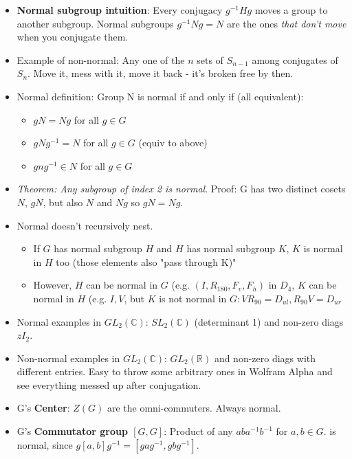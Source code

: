 \documentclass[11pt, oneside]{article}   	%
\begin{document}
\begin{itemize}
\item \textbf{Normal subgroup intuition}: Every conjugacy $g^{-1}Hg$ moves a group to another subgroup.  Normal subgroups  $g^{-1}Ng = N$ are the ones \emph{that don't move} when you conjugate them.
\item Example of non-normal: Any one of the $n$ sets of $S_{n-1}$ among conjugates of $S_n$.     Move it, mess with it, move it back - it's broken free by then.
\item Normal definition: Group N is normal if and only if (all equivalent):
	\begin{itemize}
	\item $gN = Ng$ for all $g \in G$
	\item $gNg^{-1} = N$ for all $g \in G$ (equiv to above)
	\item $gng^{-1} \in N$ for all $g \in G$
	\end{itemize}
\item \emph{Theorem: Any subgroup of index 2 is normal}.  Proof: G has two distinct cosets $N$, $gN$, but also $N$ and $Ng$ so $gN = Ng$.
\item Normal doesn't recursively nest.  
	\begin{itemize}
	\item If $G$ has normal subgroup $H$ and $H$ has normal subgroup $K$, $K$ is normal in $H$ too (those elements also "pass through K)"
	\item However, $H$ can be normal in $G$ (e.g. $(I, R_{180}, F_v, F_h)$ in $D_4$,  $K$ can be normal in $H$ (e.g. ${I, V}$, but $K$ is not normal in $G: VR_{90} = D_{ul}, R_{90}V = D_{ur}$
	\end{itemize}
\item Normal examples in $GL_2(\mathbb{C})$: $SL_2(\mathbb{C})$ (determinant 1) and non-zero diags $zI_2$.  
\item Non-normal examples in $GL_2(\mathbb{C})$: $GL_2(\mathbb{R})$ and non-zero diags with different entries. Easy to throw some arbitrary ones in Wolfram Alpha and see everything messed up after conjugation.
\item G's \textbf{Center}: $Z(G)$ are the omni-commuters.  Always normal.
\item G's \textbf{Commutator group $[G,G]$}: Product of any $aba^{-1}b^{-1}$ for $a, b \in G$. is normal, since $g[a,b]g^{-1} = [gag^{-1}, gbg^{-1}]$.
\end{itemize}
\end{document}
